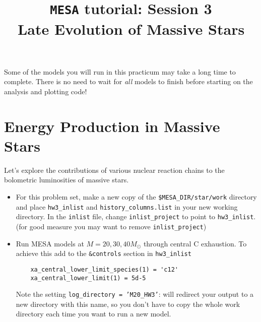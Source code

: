 \documentclass[11pt,a4paper]{article}
\newcommand{\todo}[1]{\textbf{\textcolor{red}{#1}}}
\begin{document}
\title{
    \textbf{\texttt{MESA} tutorial:  Session 3} \\
    \textbf{\Large Late Evolution of Massive Stars}
}
\date{}
\maketitle
\vspace{-1cm}

\begin{tcolorbox}[protipbox]
Some of the models you will run in this practicum may take a long time to complete.
There is no need to wait for \textit{all} models to finish before starting on the analysis and plotting code!
\end{tcolorbox}

\section{Energy Production in Massive Stars}

Let's explore the contributions of various nuclear reaction chains to the bolometric luminosities of massive stars. 

\begin{itemize}
    \item  For this problem set, make a new copy of the \texttt{\$MESA\_DIR/star/work} directory and place \texttt{hw3\_inlist} and \texttt{history\_columns.list} in your new working directory. 
    In the \texttt{inlist} file, change \texttt{inlist\_project} to point to \texttt{hw3\_inlist}.
    (for good measure you may want to remove \texttt{inlist\_project})

    \item Run MESA models at $M = 20, 30, 40 M_\odot$ through central C exhaustion.
    To achieve this add to the \texttt{\&controls} section in \texttt{hw3\_inlist}
        \begin{lstlisting}
    xa_central_lower_limit_species(1) = 'c12'
    xa_central_lower_limit(1) = 5d-5
        \end{lstlisting}
    
    Note the setting \texttt{log\_directory = 'M20\_HW3'}: will redirect your output to a new directory with this name, so you don't have to copy the whole work directory each time you want to run a new model.
    
\end{itemize}
\end{document}
